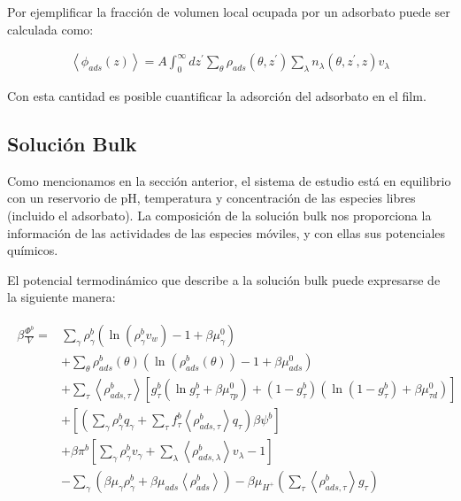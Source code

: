Por ejemplificar la fracci\'on de volumen local ocupada por un adsorbato puede ser calculada como:

\begin{align}
	\left< \phi_{ads}(z) \right> = A\int_0^\infty dz^\prime \sum_\theta \rho_{ads}(\theta, z^\prime)\sum_\lambda n_\lambda(\theta, z^\prime, z)v_\lambda
\end{align}

Con esta cantidad es posible cuantificar la adsorci\'on del adsorbato en el film. 

\subsection{Soluci\'on Bulk}\label{sec:film:bulk-solution}

Como mencionamos en la secci\'on anterior, el sistema de estudio est\'a en equilibrio con un reservorio de pH, temperatura y concentraci\'on de las especies libres (incluido el adsorbato). La composici\'on de la soluci\'on bulk nos proporciona la informaci\'on de las actividades de las especies m\'oviles, y con ellas sus potenciales qu\'imicos.

El potencial termodin\'amico que describe a la soluci\'on bulk puede expresarse de la siguiente manera: 


\begin{align}
	\begin{aligned}
		\beta\frac{ \Phi^b}{V}=  & \sum_{\gamma}{\rho^b_\gamma\left(\ln \left(\rho^b_\gamma v_w\right) -1 + \beta\mu^0_\gamma\right)} \\
		&+ \sum_{\theta}{\rho^b_{ads}(\theta)\left(\ln \left(\rho^b_{ads}(\theta)\right) -1 + \beta\mu^0_{ads} \right)} \\
		& + \sum_\tau \left<\rho^b_{ads,\tau}\right> \left[g^b_\tau(\ln g^b_\tau+ \beta\mu^0_{\tau p}) +(1-g^b_\tau)(\ln (1-g^b_\tau)+\beta\mu^0_{\tau d})\right]   \\
		& +\left[\left(\sum_{\gamma } {\rho^b_\gamma q_\gamma + \sum_\tau{f^b_\tau \left<\rho^b_{ads,\tau}\right> q_\tau} }\right)\beta\psi^b  \right] \\ 
		& +\beta\pi^b{\left[\sum_{\gamma}\rho^b_\gamma v_\gamma + \sum_\lambda{\left<\rho^b_{ads,\lambda}\right>v_\lambda}  -1 \right]} \\
		&   -\sum_\gamma \left(\beta \mu_\gamma \rho^b_\gamma + \beta \mu_{ads} \left<\rho^b_{ads}\right> \right)   -\beta\mu_{H^+} \left( \sum_\tau\left< \rho^b_{ads,\tau} \right>g_\tau  \right )
	\end{aligned}
	\label{eq:film:pot-bulk}
\end{align}

